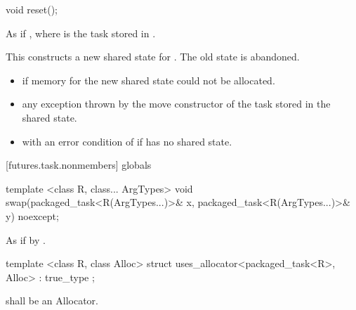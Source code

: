 %
\begin{itemdecl}
void reset();
\end{itemdecl}

\begin{itemdescr}
\pnum
\effects As if , where
 is the task stored in
. \begin{note} This constructs a new shared state for . The
old state is abandoned. \end{note}

\pnum
\throws
\begin{itemize}
\item {} if memory for the new shared state could not be allocated.
\item any exception thrown by the move constructor of the task stored in the shared
state.
\item {} with an error condition of  if 
has no shared state.
\end{itemize}
\end{itemdescr}

[futures.task.nonmembers]{ globals}

%
\begin{itemdecl}
template <class R, class... ArgTypes>
  void swap(packaged_task<R(ArgTypes...)>& x, packaged_task<R(ArgTypes...)>& y) noexcept;
\end{itemdecl}

\begin{itemdescr}
\pnum
\effects As if by .
\end{itemdescr}

%
\begin{itemdecl}
template <class R, class Alloc>
  struct uses_allocator<packaged_task<R>, Alloc>
    : true_type { };
\end{itemdecl}

\begin{itemdescr}
\pnum
\requires {} shall be an Allocator.
\end{itemdescr}
